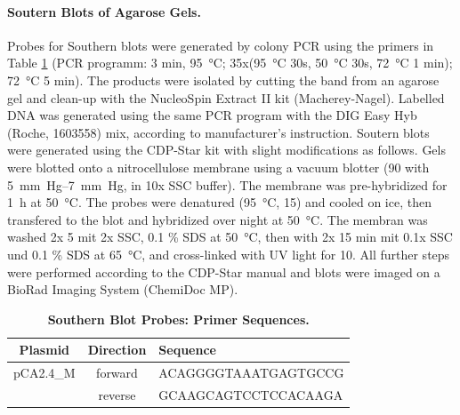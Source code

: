 \documentclass[10pt,letterpaper]{article}
\newcommand{\raim}[1]{\begingroup{\color{purple}#1}\endgroup}
\begin{document}
\paragraph{Soutern Blots of Agarose Gels.}

Probes for Southern blots were generated by colony PCR using the
primers in Table \ref{tab:blot} (PCR programm: 3 min,
\SI{95}{\celsius}; 35x(\SI{95}{\celsius} 30s, \SI{50}{\celsius} 30s,
\SI{72}{\celsius} 1 min); \SI{72}{\celsius} 5 min).  The products were
isolated by cutting the band from an agarose gel and clean-up with the
NucleoSpin Extract II kit (Macherey-Nagel).  Labelled DNA was
generated using the same PCR program with the DIG Easy Hyb (Roche, 1603558)
mix, according to manufacturer's instruction.
%
Soutern blots were generated using the CDP-Star kit with slight
modifications as follows.  Gels were blotted onto a nitrocellulose
membrane using a vacuum blotter  (\SI{90}{\min} with
\SIrange{5}{7}{mm Hg}, in 10x SSC buffer). The membrane was
pre-hybridized for \SI{1}{\hour} at \SI{50}{\celsius}.  The probes
were denatured (\SI{95}{\celsius}, \SI{15}{\min}) and cooled on ice,
then transfered to the blot and hybridized over night at
\SI{50}{\celsius}. The membran was washed 2x \SI{5}{\min} mit 2x SSC,
0.1 \% SDS at \SI{50}{\celsius}, then with 2x 15 min mit 0.1x SSC und
0.1 \% SDS at \SI{65}{\celsius}, and cross-linked with UV light
 for \SI{10}{\min}. All further steps were performed
according to the CDP-Star manual and \raim{blots were imaged on a
  BioRad Imaging System (ChemiDoc MP).}





\begin{table}[ht!]
  \begin{tabular}{c|c|l}
    Plasmid & Direction & Sequence \\
    \hline
    pCA2.4\_M &forward & ACAGGGGTAAATGAGTGCCG\\ %
    &reverse & GCAAGCAGTCCTCCACAAGA  %
  \end{tabular}
  \caption{\textbf{Southern Blot Probes: Primer Sequences.}}
  \label{tab:blot}
\end{table}
\end{document}
